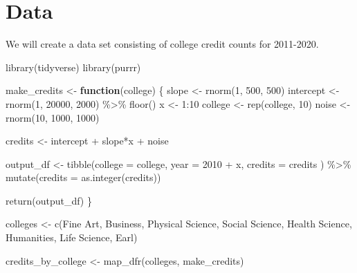 \documentclass[
]{book}
\newenvironment{Shaded}{\begin{snugshade}}{\end{snugshade}}
\newcommand{\AttributeTok}[1]{\textcolor[rgb]{0.77,0.63,0.00}{#1}}
\newcommand{\ControlFlowTok}[1]{\textcolor[rgb]{0.13,0.29,0.53}{\textbf{#1}}}
\newcommand{\DecValTok}[1]{\textcolor[rgb]{0.00,0.00,0.81}{#1}}
\newcommand{\FunctionTok}[1]{\textcolor[rgb]{0.00,0.00,0.00}{#1}}
\newcommand{\NormalTok}[1]{#1}
\newcommand{\OtherTok}[1]{\textcolor[rgb]{0.56,0.35,0.01}{#1}}
\newcommand{\SpecialCharTok}[1]{\textcolor[rgb]{0.00,0.00,0.00}{#1}}
\newcommand{\StringTok}[1]{\textcolor[rgb]{0.31,0.60,0.02}{#1}}
\begin{document}
\hypertarget{data}{%
\section{Data}\label{data}}

We will create a data set consisting of college credit counts for 2011-2020.

\begin{Shaded}
\begin{Highlighting}[]
\FunctionTok{library}\NormalTok{(tidyverse)}
\FunctionTok{library}\NormalTok{(purrr)}

\NormalTok{make\_credits }\OtherTok{\textless{}{-}} \ControlFlowTok{function}\NormalTok{(college) \{}
\NormalTok{  slope }\OtherTok{\textless{}{-}} \FunctionTok{rnorm}\NormalTok{(}\DecValTok{1}\NormalTok{, }\DecValTok{500}\NormalTok{, }\DecValTok{500}\NormalTok{)}
\NormalTok{  intercept }\OtherTok{\textless{}{-}} \FunctionTok{rnorm}\NormalTok{(}\DecValTok{1}\NormalTok{, }\DecValTok{20000}\NormalTok{, }\DecValTok{2000}\NormalTok{) }\SpecialCharTok{\%\textgreater{}\%} \FunctionTok{floor}\NormalTok{()}
\NormalTok{  x }\OtherTok{\textless{}{-}} \DecValTok{1}\SpecialCharTok{:}\DecValTok{10}
\NormalTok{  college }\OtherTok{\textless{}{-}} \FunctionTok{rep}\NormalTok{(college, }\DecValTok{10}\NormalTok{)}
\NormalTok{  noise }\OtherTok{\textless{}{-}} \FunctionTok{rnorm}\NormalTok{(}\DecValTok{10}\NormalTok{, }\DecValTok{1000}\NormalTok{, }\DecValTok{1000}\NormalTok{)}
  
\NormalTok{  credits }\OtherTok{\textless{}{-}}\NormalTok{ intercept }\SpecialCharTok{+}\NormalTok{ slope}\SpecialCharTok{*}\NormalTok{x }\SpecialCharTok{+}\NormalTok{ noise}
  
\NormalTok{  output\_df }\OtherTok{\textless{}{-}} \FunctionTok{tibble}\NormalTok{(}\AttributeTok{college =}\NormalTok{ college, }\AttributeTok{year =} \DecValTok{2010} \SpecialCharTok{+}\NormalTok{ x, }\AttributeTok{credits =}\NormalTok{ credits ) }\SpecialCharTok{\%\textgreater{}\%} 
    \FunctionTok{mutate}\NormalTok{(}\AttributeTok{credits =} \FunctionTok{as.integer}\NormalTok{(credits))}
  
  \FunctionTok{return}\NormalTok{(output\_df)}
\NormalTok{\}}


\NormalTok{colleges }\OtherTok{\textless{}{-}} \FunctionTok{c}\NormalTok{(}\StringTok{\textquotesingle{}Fine Art\textquotesingle{}}\NormalTok{, }\StringTok{\textquotesingle{}Business\textquotesingle{}}\NormalTok{, }\StringTok{\textquotesingle{}Physical Science\textquotesingle{}}\NormalTok{, }\StringTok{\textquotesingle{}Social Science\textquotesingle{}}\NormalTok{, }
              \StringTok{\textquotesingle{}Health Science\textquotesingle{}}\NormalTok{, }\StringTok{\textquotesingle{}Humanities\textquotesingle{}}\NormalTok{, }\StringTok{\textquotesingle{}Life Science\textquotesingle{}}\NormalTok{, }\StringTok{\textquotesingle{}Earl\textquotesingle{}}\NormalTok{)}

\NormalTok{credits\_by\_college }\OtherTok{\textless{}{-}} \FunctionTok{map\_dfr}\NormalTok{(colleges, make\_credits)}
\end{Highlighting}
\end{Shaded}
\end{document}
